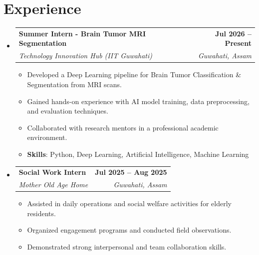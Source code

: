\documentclass[letterpaper,11pt]{article}
\makeatletter
\newcommand{\resumeItem}[1]{
  \item\small{
    {#1 \vspace{-2pt}}
  }
}
\newcommand{\resumeSubheading}[4]{
  \vspace{-2pt}\item
    \begin{tabular*}{1.0\textwidth}[t]{l@{\extracolsep{\fill}}r}
      \textbf{#1} & \textbf{\small #2} \\
      \textit{\small#3} & \textit{\small #4} \\
    \end{tabular*}\vspace{-7pt}
}
\newcommand{\resumeSubHeadingListStart}{\begin{itemize}[leftmargin=0.0in, label={}]}
\newcommand{\resumeSubHeadingListEnd}{\end{itemize}}
\newcommand{\resumeItemListStart}{\begin{itemize}}
\newcommand{\resumeItemListEnd}{\end{itemize}\vspace{-5pt}}
\makeatother
\begin{document}
\section{Experience}
  \resumeSubHeadingListStart

    \resumeSubheading
      {Summer Intern - Brain Tumor MRI Segmentation}{Jul 2026 -- Present}
      {Technology Innovation Hub (IIT Guwahati)}{Guwahati, Assam}
      \resumeItemListStart
        \resumeItem{Developed a Deep Learning pipeline for Brain Tumor Classification \& Segmentation from MRI scans.}
        \resumeItem{Gained hands-on experience with AI model training, data preprocessing, and evaluation techniques.}
        \resumeItem{Collaborated with research mentors in a professional academic environment.}
        \resumeItem{\textbf{Skills}: Python, Deep Learning, Artificial Intelligence, Machine Learning}
      \resumeItemListEnd

    \resumeSubheading
      {Social Work Intern}{Jul 2025 -- Aug 2025}
      {Mother Old Age Home}{Guwahati, Assam}
      \resumeItemListStart
        \resumeItem{Assisted in daily operations and social welfare activities for elderly residents.}
        \resumeItem{Organized engagement programs and conducted field observations.}
        \resumeItem{Demonstrated strong interpersonal and team collaboration skills.}
      \resumeItemListEnd

  \resumeSubHeadingListEnd


\end{document}
